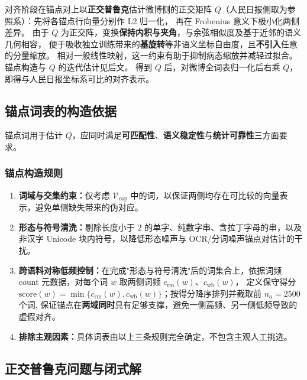 \documentclass[withoutpreface]{cumcmthesis}
\begin{document}
对齐阶段在锚点对上以\textbf{正交普鲁克}估计微博侧的正交矩阵 $Q$（人民日报侧取为参照系）：先将各锚点行向量分别作 L2 归一化，
再在 Frobenius 意义下极小化两侧差异。
由于 $Q$ 为正交阵，变换\textbf{保持内积与夹角}，与余弦相似度及基于近邻的语义几何相容，
便于吸收独立训练带来的\textbf{基旋转}等非语义坐标自由度，且\textbf{不引入}任意的分量缩放。
相对一般线性映射，这一约束有助于抑制病态缩放并减轻过拟合。锚点构造与 $Q$ 的迭代估计见后文。
得到 $Q$ 后，对微博全词表归一化后右乘 $Q$，即得与人民日报坐标系可比的对齐表示。

\subsection{锚点词表的构造依据}

锚点词用于估计 $Q$，应同时满足\textbf{可匹配性}、\textbf{语义稳定性}与\textbf{统计可靠性}三方面要求。

\subsubsection{锚点构造规则}
\begin{enumerate}[leftmargin=2em,itemsep=0.35em,parsep=0pt,topsep=0.35em]
  \item \textbf{词域与交集约束：}仅考虑 $\mathcal{V}_{\mathrm{cap}}$ 中的词，以保证两侧均存在可比较的向量表示，避免单侧缺失带来的伪对应。
  \item \textbf{形态与符号清洗：}剔除长度小于 $2$ 的单字、纯数字串、含拉丁字母的串，以及非汉字 Unicode 块内符号，以降低形态噪声与 OCR/分词噪声锚点对估计的干扰。
  \item \textbf{跨语料对称低频控制：}在完成"形态与符号清洗"后的词集合上，依据词频 count 元数据，对每个词 $w$ 取两侧词频 $c_{\mathrm{rm}}(w)$、$c_{\mathrm{wb}}(w)$，
  定义保守得分 $\mathrm{score}(w)=\min\{c_{\mathrm{rm}}(w),c_{\mathrm{wb}}(w)\}$；按得分降序排列并截取前 $n_a=2500$ 个词,
  保证锚点在\textbf{两域同时}具有足够支撑，避免一侧高频、另一侧低频导致的虚假对齐。
  \item \textbf{排除主观因素：}具体词表由以上三条规则完全确定，不包含主观人工挑选。
\end{enumerate}

\subsection{正交普鲁克问题与闭式解}
\end{document}
